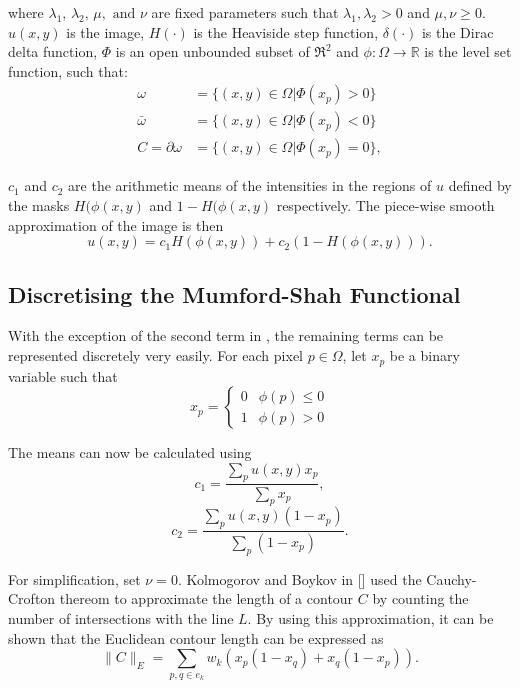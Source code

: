 \documentclass[10pt, journal, letterpaper, onecolumn, draftcls]{IEEEtran}
\begin{document}
where $\lambda_1, \, \lambda_2, \, \mu, \text{ and } \nu$ are fixed parameters such that $\lambda_1, \lambda_2 > 0$ and $\mu, \nu \geq 0$.  $u(x,y)$ is the image, $H(\cdot)$ is the Heaviside step function, $\delta(\cdot)$ is the Dirac delta function, $\Phi$ is an open unbounded subset of $\Re^2$ and $\phi:\Omega \rightarrow \mathbb{R}$ is the level set function, such that:
\begin{equation}
	\begin{split}
	\omega & = \{(x,y) \in \Omega|\Phi(x_p)>0\} \\
	\bar{\omega} & = \{(x,y) \in \Omega|\Phi(x_p)<0\} \\
	C = \partial\omega & = \{(x,y) \in \Omega|\Phi(x_p)=0\},
	\end{split}
	\label{eq:levelsetrepresentation}
\end{equation}

$c_1$ and $c_2$ are the arithmetic means of the intensities in the regions of $u$ defined by the masks $H(\phi(x,y)$ and $1-H(\phi(x,y)$ respectively. The piece-wise smooth approximation of the image is then 
\begin{equation}
	u(x,y) = c_1 H(\phi(x,y)) + c_2(1-H(\phi(x,y))).
	\label{eq:piecewiseapproximation}
\end{equation}

\subsection{Discretising the Mumford-Shah Functional}
With the exception of the second term in , the remaining terms can be represented discretely very easily. For each pixel $p \in \Omega$, let $x_p$ be a binary variable such that
\begin{equation}
	x_p = 
	\begin{cases} 
	0 & \phi(p)\leq 0 \\
	1 & \phi(p)> 0
	\end{cases}
\end{equation}

The means can now be calculated using 
\begin{equation}
	c_1 = \frac{\sum_p u(x,y)x_p}{\sum_p x_p},
\end{equation}
\begin{equation}
	c_2 = \frac{\sum_p u(x,y)(1-x_p)}{\sum_p (1-x_p)}.
\end{equation}

For simplification, set $\nu = 0$. Kolmogorov and Boykov in [] used the Cauchy-Crofton thereom to approximate the length of a contour $C$ by counting the number of intersections with the line $L$. By using this approximation, it can be shown that the Euclidean contour length can
 be expressed as
\begin{equation}
	\lVert C \rVert_E = \sum_{p,q \in e_k} w_k( x_p(1-x_q) + x_q(1-x_p)).
\end{equation}
\end{document}
